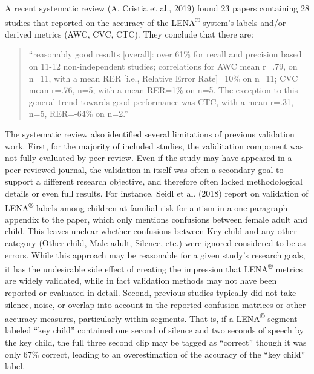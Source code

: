 \documentclass[english,table,man,floatsintext]{apa6}
\begin{document}
A recent systematic review (A. Cristia et al., 2019) found 23 papers
containing 28 studies that reported on the accuracy of the
LENA\textsuperscript{®} system's labels and/or derived metrics (AWC,
CVC, CTC). They conclude that there are:

\begin{quote}
\enquote{reasonably good results {[}overall{]}: over 61\% for recall and
precision based on 11-12 non-independent studies; correlations for AWC
mean r=.79, on n=11, with a mean RER {[}i.e., Relative Error
Rate{]}=10\% on n=11; CVC mean r=.76, n=5, with a mean RER=1\% on n=5.
The exception to this general trend towards good performance was CTC,
with a mean r=.31, n=5, RER=-64\% on n=2.}
\end{quote}

The systematic review also identified several limitations of previous
validation work. First, for the majority of included studies, the
validitation component was not fully evaluated by peer review. Even if
the study may have appeared in a peer-reviewed journal, the validation
in itself was often a secondary goal to support a different research
objective, and therefore often lacked methodological details or even
full results. For instance, Seidl et al. (2018) report on validation of
LENA\textsuperscript{®} labels among children at familial risk for
autism in a one-paragraph appendix to the paper, which only mentions
confusions between female adult and child. This leaves unclear whether
confusions between Key child and any other category (Other child, Male
adult, Silence, etc.) were ignored considered to be as errors. While
this approach may be reasonable for a given study's research goals, it
has the undesirable side effect of creating the impression that
LENA\textsuperscript{®} metrics are widely validated, while in fact
validation methods may not have been reported or evaluated in detail.
Second, previous studies typically did not take silence, noise, or
overlap into account in the reported confusion matrices or other
accuracy measures, particularly within segments. That is, if a
LENA\textsuperscript{®} segment labeled \enquote{key child} contained
one second of silence and two seconds of speech by the key child, the
full three second clip may be tagged as \enquote{correct} though it was
only 67\% correct, leading to an overestimation of the accuracy of the
\enquote{key child} label.
\end{document}
